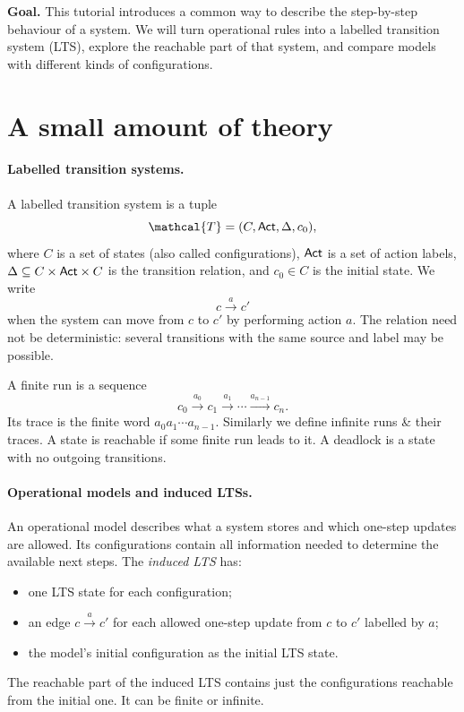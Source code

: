 \documentclass{tutorial}
\begin{document}
\maketitle

\noindent\textbf{Goal.} This tutorial introduces a common way to describe the
step-by-step behaviour of a system. We will turn operational rules into a
labelled transition system (LTS), explore the reachable part of that system,
and compare models with different kinds of configurations.

\section*{A small amount of theory}

\paragraph{Labelled transition systems.}
A labelled transition system is a tuple
\[
  \mathcal{T}=(C,\Act,\Delta,c_0),
\]
where $C$ is a set of states (also called configurations), $\mathsf{Act}$ is a set
of action labels, $\Delta\subseteq C\times\mathsf{Act}\times C$ is the
transition relation, and $c_0\in C$ is the initial state. We write
\[
  c\xrightarrow{a}c'
\]
when the system can move from $c$ to $c'$ by performing action $a$.
The relation need not be deterministic: several transitions with the same
source and label may be possible.

A finite run is a sequence
\[
  c_0\xrightarrow{a_0}c_1\xrightarrow{a_1}\cdots
  \xrightarrow{a_{n-1}}c_n.
\]
Its trace is the finite word $a_0a_1\cdots a_{n-1}$. 
Similarly we define infinite runs \& their traces.
A state is reachable
if some finite run leads to it. A deadlock is a state with no outgoing
transitions.

\paragraph{Operational models and induced LTSs.}
An operational model describes what a system stores and which one-step
updates are allowed. Its configurations contain all information needed to
determine the available next steps. The \emph{induced LTS} has:
\begin{itemize}
  \item one LTS state for each configuration;
  \item an edge $c\xrightarrow{a}c'$ for each allowed one-step update
        from $c$ to $c'$ labelled by $a$;
  \item the model's initial configuration as the initial LTS state.
\end{itemize}
The reachable part of the induced LTS contains just the configurations
reachable from the initial one. It can be finite or infinite.
\end{document}
